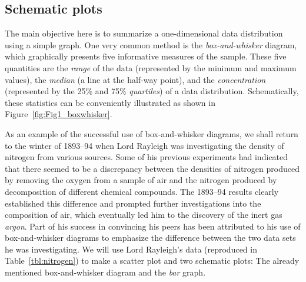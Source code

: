 \subsection{Schematic plots}

	The main objective here is to summarize a one-dimensional data distribution using a simple graph.  One very 
common method is the \emph{box-and-whisker} diagram, which graphically presents five informative 
measures of the sample.  These five quantities are the \emph{range} of the data (represented by the minimum and maximum 
values), the \emph{median} (a line at the half-way point), and the \emph{concentration} (represented by the 25\% and 75\% \emph{quartiles}) of a data 
distribution.  Schematically, these statistics can be conveniently illustrated as shown in Figure~\ref{fig:Fig1_boxwhisker}.

	As an example of the successful use of box-and-whisker diagrams, we shall return to the winter of 
1893--94 when Lord Rayleigh was investigating the density of nitrogen from various sources.
Some of his previous experiments had indicated that there seemed to be a discrepancy between 
the densities of nitrogen produced by removing the oxygen from a sample of air and the nitrogen produced by 
decomposition of different chemical compounds.  The 1893--94 results clearly established this difference 
and prompted further investigations into the composition of air, which eventually led him to the 
discovery of the inert gas \emph{argon}.  Part of his success in convincing his peers has been attributed 
to his use of box-and-whisker diagrams to emphasize the difference between the two data sets he 
was investigating.  We will use Lord Rayleigh's data (reproduced in Table~\ref{tbl:nitrogen}) to make a scatter 
plot and two schematic plots:  The already mentioned box-and-whisker diagram and the \emph{bar} graph.

